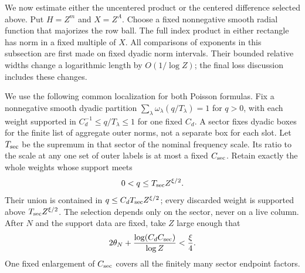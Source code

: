 \documentclass[12pt]{article}
\begin{document}
We now estimate either the uncentered product or the centered
difference selected above.  Put \(H=Z^m\) and \(X=Z^A\).  Choose a
fixed nonnegative smooth radial function that majorizes the row ball.
The full index product in either rectangle has norm in a fixed
multiple of \(X\).  All comparisons of exponents in this subsection
are first made on fixed dyadic norm intervals.  Their bounded
relative widths change a logarithmic length by \(O(1/\log Z)\);
the final loss discussion includes these changes.

We use the following common localization for both Poisson formulas.
Fix a nonnegative smooth dyadic partition
\(\sum_\lambda\omega_\lambda(q/T_\lambda)=1\) for \(q>0\),
with each weight supported in \(C_d^{-1}\le q/T_\lambda\le1\)
for one fixed \(C_d\).  A
sector fixes dyadic boxes for the finite list of aggregate outer norms,
not a separate box for each slot.  Let \(T_{\rm sec}\) be the
supremum in that sector of the nominal frequency scale.  Its ratio to
the scale at any one set of outer labels is at most a fixed
\(C_{\rm sec}\).  Retain exactly the whole weights whose support
meets
\[
 0<q\le T_{\rm sec}Z^{\xi/2}.
\]
Their union is contained in \(q\le C_dT_{\rm sec}Z^{\xi/2}\);
every discarded weight is supported above \(T_{\rm sec}Z^{\xi/2}\).
The selection depends only on the sector, never on a live column.
After \(N\) and the support data are fixed, take \(Z\) large enough
that
\begin{equation}
 2\theta_N+\frac{\log(C_dC_{\rm sec})}{\log Z}<\frac\xi4.
 \label{eq:centered-localization-threshold}
\end{equation}
One fixed enlargement of \(C_{\rm sec}\) covers all the finitely many
sector endpoint factors.
\end{document}
